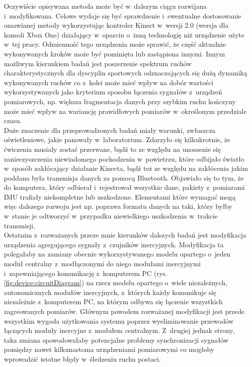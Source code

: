 Oczywiście opisywana metoda może być w~dalszym ciągu rozwijana i~modyfikowana. Celowe wydaje się być  sprawdzenie i~ewentualne dostosowanie omawianej metody wykorzystując kontroler Kinect w~wersji 2.0 (wersja dla konsoli Xbox One) działający w~oparciu o~inną technologię niż urządzenie użyte w~tej pracy. Odmienność tego urządzenia może sprawić, że część aktualnie wykonywanych kroków może być pominięta lub zastąpiona innymi. Innym możliwym kierunkiem badań jest poszerzenie spektrum ruchów charakterystycznych dla dyscyplin sportowych odznaczających się dużą dynamiką wykonywanych ruchów co z~kolei może mieć wpływ na dobór wartości wykorzystywanych jako kryterium sposobu łączenia sygnałów z~urządzeń pomiarowych, np. większa fragmentacja danych przy szybkim ruchu kończyny może mieć wpływ na wariancję prawidłowych pomiarów w~określonym przedziale czasu.\\
Duże znaczenie dla przeprowadzonych badań miały warunki, zwłaszcza oświetleniowe, jakie panowały w~laboratorium. Zdarzyło się kilkukrotnie, że ćwiczenia musiały zostać przerwane, bądź to ze względu na unoszenie się zanieczyszczenia niewiadomego pochodzenia w~powietrzu, które odbijało światło w~sposób zakłócający działanie Kinecta, bądź też ze względu na zakłócenia jakim poddana była transmisja danych za pomocą Bluetooth. Objawiało się to tym, że do komputera, który odbierał i~rejestrował wszystkie dane, pakiety z~pomiarami IMU trafiały niekompletne lub uszkodzone. Elementami które wymagać mogą więc dalszego rozwoju jest np. poprawa formatu danych na taki, który byłby w~stanie je odtworzyć w~przypadku niewielkiego uszkodzenia w~trakcie transmisji.\\
Ostatnim z~rozważanych przeze mnie kierunków dalszych badań jest modyfikacja urządzenia agregującego sygnały z~czujników inercyjnych. Modyfikacja ta polegałaby na zamiany obecnie wykorzystywanego modelu opartego o~jeden moduł centralny z~modłączonymi do niego modułami inercyjnymi i~zapewniającego komunikację z~komputerem PC (rys. \ref{fig:device:circuitDiagram}) na rzecz modelu opartego o~wiele niezależnych, autonomicznych modułów inercyjnych, z~których każdy komunikuje się niezależnie z~komputerem PC, na którym odbywa się łączenie wszystkich zagreowanych pomiarów. Głównym powodem rozważanej modyfikacji jest przede wszystkim wygoda użytkowania systemu poprzez wyeliminowanie przewodów łączących moduły inercyjne z~modułem centralnym. Z~drugiej jednak strony, taka zmiana spowodowałaby potencjalne problemy synchronizacji sygnałów pomiędzy nawet kilkunastoma urządzeniami pomiarowymi co mogłoby wprowadzić istotne błędy w~śledzeniu ruchu postaci.


